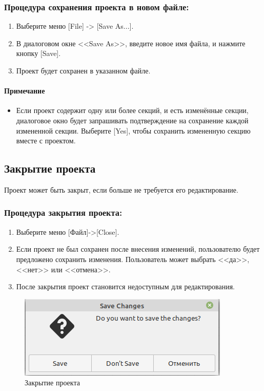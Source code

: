 \documentclass[a4paper,12pt]{report}
\begin{document}
\subsubsection*{Процедура сохранения проекта в новом файле:}
\begin{enumerate}
	\item Выберите меню [File] -> [Save As...].
	\item В диалоговом окне <<Save As>>, введите новое имя файла, и нажмите кнопку [Save].
	\item Проект будет сохранен в указанном файле.
\end{enumerate}

\paragraph{Примечание}
\begin{itemize}
	\item Если проект содержит одну или более секций, и есть изменённые секции, диалоговое окно
	будет запрашивать подтверждение на сохранение каждой измененной секции. Выберите
	[Yes], чтобы сохранить измененную секцию вместе с проектом.
\end{itemize}

\subsection*{Закрытие проекта}
Проект может быть закрыт, если больше не требуется его редактирование.
\subsubsection*{Процедура закрытия проекта:}
\begin{enumerate}
	\item Выберите меню [Файл]->[Close].
	\item Если проект не был сохранен после внесения изменений, пользователю будет предложено
	сохранить изменения. Пользователь может выбрать <<да>>, <<нет>> или <<отмена>>.
	\item После закрытия проект становится недоступным для редактирования.
\end{enumerate}

\begin{figure}[h!]
	\centering
	\includegraphics[width=0.4\linewidth]{images/closeproject1}
	\caption{Закрытие проекта}
	\label{fig:closeproject1}
\end{figure}
\end{document}
